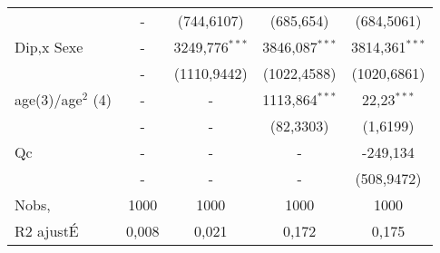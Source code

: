 \begin{table}[H]
\begin{center}
\begin{tabular}{lcccc}
   & -  & (744,6107)  & (685,654)  & (684,5061)  \\                                                                                                                                                                                                   
Dip,x Sexe  & -  & 3249,776$^{***}$  & 3846,087$^{***}$  & 3814,361$^{***}$  \\                                                                                                                                                                       
   & -  & (1110,9442)  & (1022,4588)  & (1020,6861)  \\                                                                                                                                                                                               
age(3)/age$^2$ (4)  & -  & -  & 1113,864$^{***}$  & 22,23$^{***}$  \\                                                                                                                                                                                 
   & -  & -  & (82,3303)  & (1,6199)  \\                                                                                                                                                                                                              
Qc  & -  & -  & -  & -249,134  \\                                                                                                                                                                                                                     
   & -  & -  & -  & (508,9472)  \\                                                                                                                                                                                                                    
Nobs,  & 1000  & 1000  & 1000  & 1000  \\                                                                                                                                                                                                             
R2 ajust\'{E}  & 0,008  & 0,021  & 0,172  & 0,175  \\  \bottomrule\bottomrule                                                                                                                                                                         
\end{tabular}                                                                                                                                                                                                                                         

\end{center}
\end{table}
